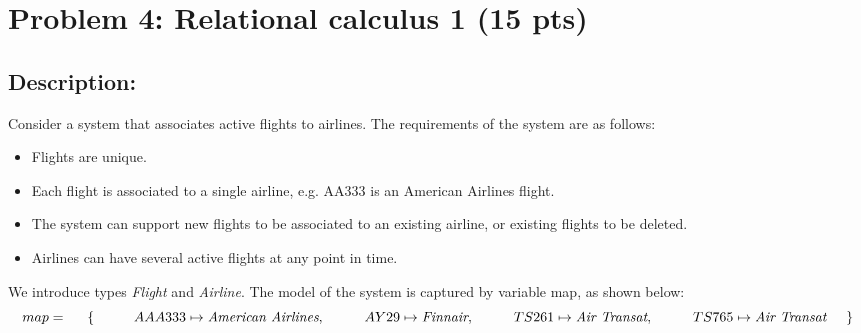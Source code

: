 \section{Problem 4: Relational calculus 1 (15 pts)}

\subsection{Description:}

\noindent Consider a system that associates active flights to airlines. The requirements of the system
are as follows:

\begin{itemize}
  \item Flights are unique.
  \item Each flight is associated to a single airline, e.g. AA333 is an American Airlines flight.
  \item The system can support new flights to be associated to an existing airline, or existing flights to be deleted.
  \item Airlines can have several active flights at any point in time.
\end{itemize}

\noindent We introduce types \emph{Flight} and \emph{Airline}. The model of the system is captured by variable
map, as shown below:\\

\[
map = \\
\hspace{5mm} \{ \\
\hspace{10mm} AAA333 \mapsto \emph{American Airlines},\\
\hspace{10mm} AY29 \mapsto \emph{Finnair},\\
\hspace{10mm} TS261 \mapsto \emph{Air Transat},\\
\hspace{10mm} TS765 \mapsto \emph{Air Transat}\\
\hspace{5mm} \}
\]

